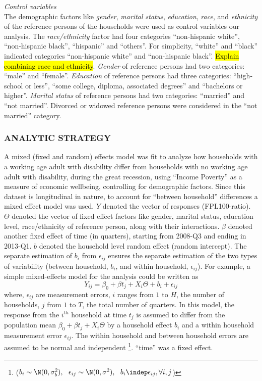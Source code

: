 \documentclass[11pt]{extarticle} %
\begin{document}
\noindent
{\emph{Control variables}}\\
The demographic factors like {\emph{gender}}, {\emph{marital status}}, {\emph{education}}, {\emph{race}}, and {\emph{ethnicity}} of the reference persons of the households were used as control variables our analysis. The {\emph{race/ethnicity}} factor had four categories ``non-hispanic white'', ``non-hispanic black'', ``hispanic'' and ``others''. For simplicity, ``white'' and ``black'' indicated categories ``non-hispanic white'' and ``non-hispanic black''. {\hl{Explain combining race and ethnicity}}. {\emph{Gender}} of reference persons had two categories: ``male'' and ``female''. {\emph{Education}} of reference persons had three categories: ``high-school or less'', ``some college, diploma, associated degrees'' and ``bachelors or higher''. {\emph{Marital status}} of reference persons had two categories: ``married'' and ``not married''. Divorced or widowed reference persons were considered in the ``not married'' category.

\subsubsection*{ANALYTIC STRATEGY}
A mixed (fixed and random) effects model was fit to analyze how households with a working age adult with disability differ from households with no working age adult with disability, during the great recession, using “Income Poverty” as a measure of economic wellbeing, controlling for demographic factors. Since this dataset is longitudinal in nature, to account for ``between household'' differences a mixed effect model was used. $Y$ denoted the vector of responses (FPL100-ratio). $\Theta$ denoted the vector of fixed effect factors like gender, marital status, education level, race/ethnicity of reference person, along with their interactions. $\beta$ denoted another fixed effect of time (in quarters), starting from 2008-Q3 and ending in 2013-Q1. $b$ denoted the household level random effect (random intercept). The separate estimation of $b_i$ from $\epsilon_{ij}$ ensures the separate estimation of the two types of variability (between household, $b_i$, and within household, $\epsilon_{ij}$). For example, a simple mixed-effects model for the analysis could be written as
\vspace{-0.5cm}
\begin{equation}
Y_{ij} = \beta_0 + \beta t_j + X_i\Theta + b_i + \epsilon_{ij}
\label{eq:MixedEffects1}
\end{equation}
where, $\epsilon_{ij}$ are measurement errors, $i$ ranges from $1$ to $H$, the number of households, $j$ from $1$ to $T$, the total number of quarters. In this model, the response from the $i^{th}$ household at time $t_j$ is assumed to differ from the population mean $\beta_0 + \beta t_j + X_i\Theta$ by a household effect $b_i$ and a within household measurement error $\epsilon_{ij}$. The within household and between household errors are assumed to be normal and independent \footnote{($b_i \sim \N(0, \sigma^2_b),\ \ \epsilon_{ij} \sim \N(0, \sigma^2), \ \ b_i \indep \epsilon_{ij}, \forall i, j$)}. ``time'' was a fixed effect. 
\end{document}
